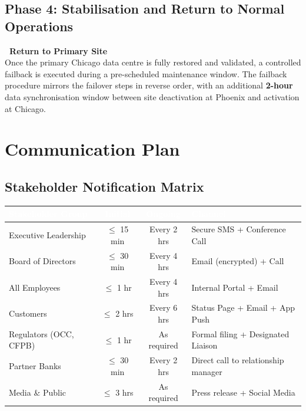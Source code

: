 \documentclass[a4paper,11pt]{article}
\begin{document}
\subsection{Phase 4: Stabilisation and Return to Normal Operations}

\begin{infobox}
\textbf{\faClock\ Return to Primary Site}\\[4pt]
Once the primary Chicago data centre is fully restored and validated, a controlled failback is executed during a pre-scheduled maintenance window. The failback procedure mirrors the failover steps in reverse order, with an additional \textbf{2-hour} data synchronisation window between site deactivation at Phoenix and activation at Chicago.
\end{infobox}

\clearpage

\section{Communication Plan}

\subsection{Stakeholder Notification Matrix}

\begin{tcolorbox}[colback=lightgray, colframe=primary, boxrule=0.5pt, arc=3pt, left=10pt, right=10pt, top=8pt, bottom=8pt]
\begin{tabularx}{\textwidth}{@{}l c c X@{}}
  \toprule
  \rowcolor{tablehead}
  \textcolor{white}{\textbf{Stakeholder Group}} & \textcolor{white}{\textbf{Initial}} & \textcolor{white}{\textbf{Ongoing}} & \textcolor{white}{\textbf{Channel}}\\
  \midrule
  \rowcolor{tablerow}
  Executive Leadership & $\leqslant$ 15 min & Every 2 hrs & Secure SMS + Conference Call\\
  Board of Directors & $\leqslant$ 30 min & Every 4 hrs & Email (encrypted) + Call\\
  \rowcolor{tablerow}
  All Employees & $\leqslant$ 1 hr & Every 4 hrs & Internal Portal + Email\\
  Customers & $\leqslant$ 2 hrs & Every 6 hrs & Status Page + Email + App Push\\
  \rowcolor{tablerow}
  Regulators (OCC, CFPB) & $\leqslant$ 1 hr & As required & Formal filing + Designated Liaison\\
  Partner Banks & $\leqslant$ 30 min & Every 2 hrs & Direct call to relationship manager\\
  \rowcolor{tablerow}
  Media \& Public & $\leqslant$ 3 hrs & As required & Press release + Social Media\\
  \bottomrule
\end{tabularx}
\end{tcolorbox}
\end{document}
